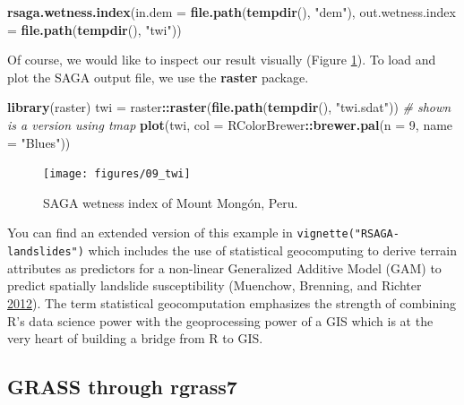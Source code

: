 \documentclass[]{krantz}
\newenvironment{Shaded}{\begin{snugshade}}{\end{snugshade}}
\newcommand{\CommentTok}[1]{\textcolor[rgb]{0.37,0.37,0.37}{\textit{#1}}}
\newcommand{\DataTypeTok}[1]{\textcolor[rgb]{0.27,0.27,0.27}{#1}}
\newcommand{\DecValTok}[1]{\textcolor[rgb]{0.06,0.06,0.06}{#1}}
\newcommand{\KeywordTok}[1]{\textcolor[rgb]{0.27,0.27,0.27}{\textbf{#1}}}
\newcommand{\NormalTok}[1]{#1}
\newcommand{\OperatorTok}[1]{\textcolor[rgb]{0.43,0.43,0.43}{\textbf{#1}}}
\newcommand{\StringTok}[1]{\textcolor[rgb]{0.5,0.5,0.5}{#1}}
\begin{document}
\begin{Shaded}
\begin{Highlighting}[]
\KeywordTok{rsaga.wetness.index}\NormalTok{(}\DataTypeTok{in.dem =} \KeywordTok{file.path}\NormalTok{(}\KeywordTok{tempdir}\NormalTok{(), }\StringTok{"dem"}\NormalTok{), }
                    \DataTypeTok{out.wetness.index =} \KeywordTok{file.path}\NormalTok{(}\KeywordTok{tempdir}\NormalTok{(), }\StringTok{"twi"}\NormalTok{))}
\end{Highlighting}
\end{Shaded}

Of course, we would like to inspect our result visually (Figure \ref{fig:saga-twi}).
To load and plot the SAGA output file, we use the \textbf{raster} package.

\begin{Shaded}
\begin{Highlighting}[]
\KeywordTok{library}\NormalTok{(raster)}
\NormalTok{twi =}\StringTok{ }\NormalTok{raster}\OperatorTok{::}\KeywordTok{raster}\NormalTok{(}\KeywordTok{file.path}\NormalTok{(}\KeywordTok{tempdir}\NormalTok{(), }\StringTok{"twi.sdat"}\NormalTok{))}
\CommentTok{# shown is a version using tmap}
\KeywordTok{plot}\NormalTok{(twi, }\DataTypeTok{col =}\NormalTok{ RColorBrewer}\OperatorTok{::}\KeywordTok{brewer.pal}\NormalTok{(}\DataTypeTok{n =} \DecValTok{9}\NormalTok{, }\DataTypeTok{name =} \StringTok{"Blues"}\NormalTok{))}
\end{Highlighting}
\end{Shaded}

\begin{figure}[t]

{\centering \texttt{[image: figures/09\_twi]} 

}

\caption{SAGA wetness index of Mount Mongón, Peru.}\label{fig:saga-twi}
\end{figure}

You can find an extended version of this example in \texttt{vignette("RSAGA-landslides")} which includes the use of statistical geocomputing to derive terrain attributes as predictors for a non-linear Generalized Additive Model (GAM) to predict spatially landslide susceptibility (Muenchow, Brenning, and Richter \protect\hyperlink{ref-muenchow_geomorphic_2012}{2012}).
The term statistical geocomputation emphasizes the strength of combining R's data science power with the geoprocessing power of a GIS which is at the very heart of building a bridge from R to GIS.

\hypertarget{rgrass}{%
\subsection{\texorpdfstring{GRASS through \textbf{rgrass7}}{GRASS through rgrass7}}\label{rgrass}}
\end{document}
